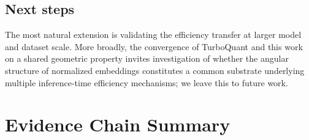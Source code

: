 \documentclass[11pt]{article}
\begin{document}
\subsection{Next steps}

The most natural extension is validating the efficiency transfer at larger model and
dataset scale.
More broadly, the convergence of TurboQuant and this work on a shared geometric property
invites investigation of whether the angular structure of normalized embeddings constitutes
a common substrate underlying multiple inference-time efficiency mechanisms;
we leave this to future work.




\appendix
\section{Evidence Chain Summary}
\end{document}
